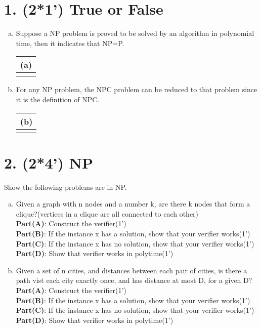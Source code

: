 \documentclass{article}
\begin{document}
\section*{1. (2*1') True or False}
\begin{enumerate}[(a)]
	\item Suppose a NP problem is proved to be solved by an algorithm in polynomial time, then it indicates that NP=P.\\
	\vspace{1em}
	\begin{tabular}{|c|}
		\hline
		(a)\\
		\hline
		  \\
		\hline
	\end{tabular}
	\item For any NP problem, the NPC problem can be reduced to that problem since it is the definition of NPC.\\
	\vspace{1em}
	\begin{tabular}{|c|}
		\hline
		(b)\\
		\hline
		  \\
		\hline
	\end{tabular}
\end{enumerate}

\section*{2. (2*4') NP}

Show the following problems are in NP. 
\begin{enumerate}[(a)]
	\item Given a graph with n nodes and a number k, are there k nodes that form a clique?(vertices in a clique are all connected to each other)\\
	\textbf{Part(A)}: Construct the verifier(1')\\
	\textbf{Part(B)}: If the instance x has a solution, show that your verifier works(1')\\
	\textbf{Part(C)}: If the instance x has no solution, show that your verifier works(1')\\
	\textbf{Part(D)}: Show that verifier works in polytime(1')\\
	\vspace{30mm}
	\item Given a set of n cities, and distances between each pair of cities, is there a path vist each city exactly once, and has distance at most D, for a given D? \\
	\textbf{Part(A)}: Construct the verifier(1')\\
	\textbf{Part(B)}: If the instance x has a solution, show that your verifier works(1')\\
	\textbf{Part(C)}: If the instance x has no solution, show that your verifier works(1')\\
	\textbf{Part(D)}: Show that verifier works in polytime(1')\\
\end{enumerate}
\end{document}
